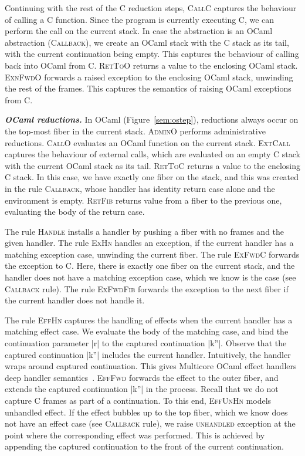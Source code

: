 \documentclass[sigplan,10pt,review,anonymous]{acmart}\settopmatter{printfolios=true,printccs=false,printacmref=false}
\begin{document}
Continuing with the rest of the C reduction steps, \textsc{CallC} captures the
behaviour of calling a C function. Since the program is currently executing C,
we can perform the call on the current stack. In case the abstraction is an
OCaml abstraction (\textsc{Callback}), we create an OCaml stack with the C
stack as its tail, with the current continuation being empty. This captures the
behaviour of calling back into OCaml from C. \textsc{RetToO} returns a value to
the enclosing OCaml stack. \textsc{ExnFwdO} forwards a raised exception to the
enclosing OCaml stack, unwinding the rest of the frames. This captures the
semantics of raising OCaml exceptions from C.

\textbf{\textit{OCaml reductions.}} In OCaml (Figure~\ref{sem:ostep}),
reductions always occur on the top-most fiber in the current stack.
\textsc{AdminO} performs administrative reductions. \textsc{CallO} evaluates an
OCaml function on the current stack. \textsc{ExtCall} captures the behaviour of
external calls, which are evaluated on an empty C stack with the current OCaml
stack as its tail. \textsc{RetToC} returns a value to the enclosing C stack. In
this case, we have exactly one fiber on the stack, and this was created in the
rule \textsc{Callback}, whose handler has identity return case alone and the
environment is empty. \textsc{RetFib} returns value from a fiber to the
previous one, evaluating the body of the return case.

The rule \textsc{Handle} installs a handler by pushing a fiber with no frames
and the given handler. The rule \textsc{ExHn} handles an exception, if the
current handler has a matching exception case, unwinding the current fiber. The
rule \textsc{ExFwdC} forwards the exception to C. Here, there is exactly one
fiber on the current stack, and the handler does not have a matching exception
case, which we know is the case (see \textsc{Callback} rule). The rule
\textsc{ExFwdFib} forwards the exception to the next fiber if the current
handler does not handle it.

The rule \textsc{EffHn} captures the handling of effects when the current
handler has a matching effect case. We evaluate the body of the matching case,
and bind the continuation parameter |r| to the captured continuation |k''|.
Observe that the captured continuation |k''| includes the current handler.
Intuitively, the handler wraps around captured continuation. This gives
Multicore OCaml effect handlers deep handler semantics~\cite{Hillerstrom20}.
\textsc{EffFwd} forwards the effect to the outer fiber, and extends the
captured continuation |k''| in the process. Recall that we do not capture C
frames as part of a continuation. To this end, \textsc{EffUnHn} models
unhandled effect. If the effect bubbles up to the top fiber, which we know does
not have an effect case (see \textsc{Callback} rule), we raise
\textsc{unhandled} exception at the point where the corresponding effect was
performed. This is achieved by appending the captured continuation to the front
of the current continuation.
\end{document}
